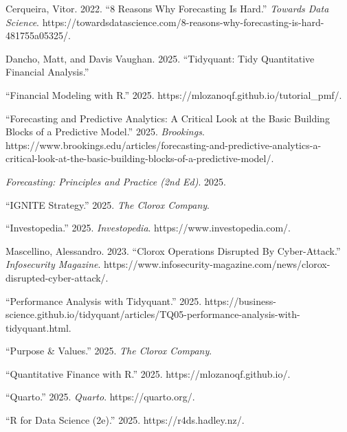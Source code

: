 \documentclass[
  letterpaper,
  DIV=11,
  numbers=noendperiod]{scrartcl}
\newlength{\cslhangindent}
\newenvironment{CSLReferences}[2] %
 {\begin{list}{}{%
  \setlength{\itemindent}{0pt}
  \setlength{\leftmargin}{0pt}
  \setlength{\parsep}{0pt}
  \ifodd #1
   \setlength{\leftmargin}{\cslhangindent}
   \setlength{\itemindent}{-1\cslhangindent}
  \fi
  \setlength{\itemsep}{#2\baselineskip}}}
 {\end{list}}
\begin{document}
\label{refs}
\begin{CSLReferences}{1}{0}
Cerqueira, Vitor. 2022. {``8 {Reasons Why Forecasting Is Hard}.''}
\emph{Towards Data Science}.
https://towardsdatascience.com/8-reasons-why-forecasting-is-hard-481755a05325/.

Dancho, Matt, and Davis Vaughan. 2025. {``Tidyquant: {Tidy Quantitative
Financial Analysis}.''}

{``Financial Modeling with {R}.''} 2025.
https://mlozanoqf.github.io/tutorial\_pmf/.

{``Forecasting and Predictive Analytics: {A} Critical Look at the Basic
Building Blocks of a Predictive Model.''} 2025. \emph{Brookings}.
https://www.brookings.edu/articles/forecasting-and-predictive-analytics-a-critical-look-at-the-basic-building-blocks-of-a-predictive-model/.

\emph{Forecasting: {Principles} and {Practice} (2nd Ed)}. 2025.

{``{IGNITE Strategy}.''} 2025. \emph{The Clorox Company}.

{``Investopedia.''} 2025. \emph{Investopedia}.
https://www.investopedia.com/.

Mascellino, Alessandro. 2023. {``Clorox {Operations Disrupted By
Cyber-Attack}.''} \emph{Infosecurity Magazine}.
https://www.infosecurity-magazine.com/news/clorox-disrupted-cyber-attack/.

{``Performance {Analysis} with Tidyquant.''} 2025.
https://business-science.github.io/tidyquant/articles/TQ05-performance-analysis-with-tidyquant.html.

{``Purpose \& {Values}.''} 2025. \emph{The Clorox Company}.

{``Quantitative Finance with {R}.''} 2025. https://mlozanoqf.github.io/.

{``Quarto.''} 2025. \emph{Quarto}. https://quarto.org/.

{``R for {Data Science} (2e).''} 2025. https://r4ds.hadley.nz/.


\end{CSLReferences}
\end{document}
